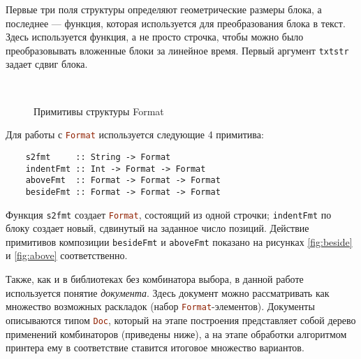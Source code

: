 Первые три поля структуры определяют геометрические размеры блока, а последнее --- функция,
которая используется для преобразования блока в текст. Здесь используется функция, а не
просто строчка, чтобы можно было преобразовывать вложенные блоки за линейное время. Первый
аргумент \lstinline[language = Haskell]{txtstr} задает сдвиг блока.

\begin{figure}
  \centering
  ~
  ~
  \caption{Примитивы структуры Format}
  \label{fig:basicConcat}
\end{figure}

Для работы с \lstinline[language = Haskell]{Format} используется следующие 4 примитива:
\begin{lstlisting}
    s2fmt     :: String -> Format
    indentFmt :: Int -> Format -> Format
    aboveFmt  :: Format -> Format -> Format
    besideFmt :: Format -> Format -> Format
\end{lstlisting}

Функция \lstinline[language = Haskell]{s2fmt} создает \lstinline[language = Haskell]{Format},
состоящий из одной строчки; \lstinline[language = Haskell]{indentFmt} по блоку создает новый,
сдвинутый на заданное число позиций. Действие примитивов композиции
\lstinline[language = Haskell]{besideFmt} и \lstinline[language = Haskell]{aboveFmt}
показано на рисунках \ref{fig:beside} и \ref{fig:above} соответственно.

Также, как и в библиотеках без комбинатора выбора, в данной работе используется понятие
\emph{документа}. Здесь документ можно рассматривать как множество возможных раскладок
(набор \lstinline[language = Haskell]{Format}-элементов). Документы описываются типом
\lstinline[language = Haskell]{Doc}, который на этапе построения представляет собой
дерево применений комбинаторов (приведены ниже), а на этапе обработки алгоритмом
принтера ему в соответствие ставится итоговое множество вариантов.

